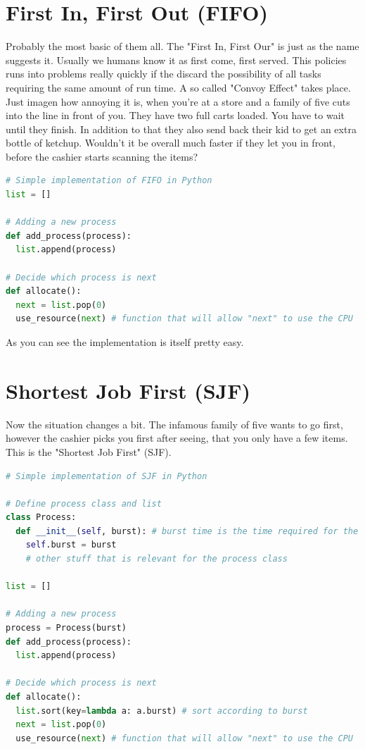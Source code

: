 \documentclass{report}
\begin{document}
\section{First In, First Out (FIFO)}

Probably the most basic of them all.
The "First In, First Our" is just as the name suggests it. 
Usually we humans know it as first come, first served. 
This policies runs into problems really quickly if the discard the possibility of all tasks requiring the same amount of run time. 
A so called "Convoy Effect" takes place. 
Just imagen how annoying it is, when you're at a store and a family of five cuts into the line in front of you. 
They have two full carts loaded. You have to wait until they finish. 
In addition to that they also send back their kid to get an extra bottle of ketchup. 
Wouldn't it be overall much faster if they let you in front, before the cashier starts scanning the items?

\begin{lstlisting}[language=Python, style=colorEX, label=cd:fifo-python]
# Simple implementation of FIFO in Python
list = []

# Adding a new process
def add_process(process):
  list.append(process)

# Decide which process is next
def allocate():
  next = list.pop(0)
  use_resource(next) # function that will allow "next" to use the CPU
\end{lstlisting}

As you can see the implementation is itself pretty easy.
\pagebreak

\section{Shortest Job First (SJF)}

Now the situation changes a bit. 
The infamous family of five wants to go first, however the cashier picks you first after seeing, that you only have a few items.
This is the "Shortest Job First" (SJF). 

\begin{lstlisting}[language=Python, style=colorEX, label=cd:sjf-python]
# Simple implementation of SJF in Python

# Define process class and list
class Process:
  def __init__(self, burst): # burst time is the time required for the process to finish
    self.burst = burst
    # other stuff that is relevant for the process class

list = []

# Adding a new process
process = Process(burst) 
def add_process(process): 
  list.append(process)

# Decide which process is next
def allocate():
  list.sort(key=lambda a: a.burst) # sort according to burst
  next = list.pop(0)
  use_resource(next) # function that will allow "next" to use the CPU
\end{lstlisting}
\end{document}
